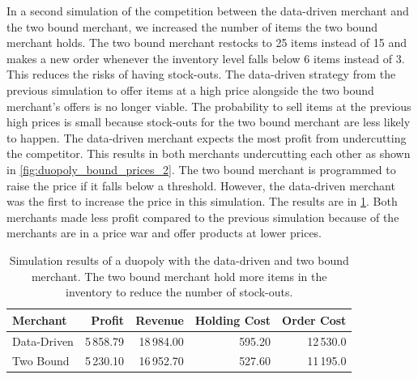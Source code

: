 In a second simulation of the competition between the data-driven merchant and the two bound merchant, we increased the number of items the two bound merchant holds.
The two bound merchant restocks to 25 items instead of 15 and makes a new order whenever the inventory level falls below 6 items instead of 3.
This reduces the risks of having stock-outs.
The data-driven strategy from the previous simulation to offer items at a high price alongside the two bound merchant's offers is no longer viable.
The probability to sell items at the previous high prices is small because stock-outs for the two bound merchant are less likely to happen.
The data-driven merchant expects the most profit from undercutting the competitor.
This results in both merchants undercutting each other as shown in \cref{fig:duopoly_bound_prices_2}.
The two bound merchant is programmed to raise the price if it falls below a threshold.
However, the data-driven merchant was the first to increase the price in this simulation.
The results are in \cref{tab:duopoly_bound_2}.
Both merchants made less profit compared to the previous simulation because of the merchants are in a price war and offer products at lower prices.

\begin{table}[t]
	\centering
	\begin{tabular}{lrrrr}
		\toprule
		Merchant & Profit & Revenue & Holding Cost & Order Cost \\
		\midrule
		Data-Driven & 5\,858.79 & 18\,984.00 & 595.20 & 12\,530.0 \\
		Two Bound & 5\,230.10 & 16\,952.70 & 527.60 & 11\,195.0 \\
		\bottomrule
	\end{tabular}
	\caption{Simulation results of a duopoly with the data-driven and two bound merchant. The two bound merchant hold more items in the inventory to reduce the number of stock-outs.}
	\label{tab:duopoly_bound_2}
\end{table}


